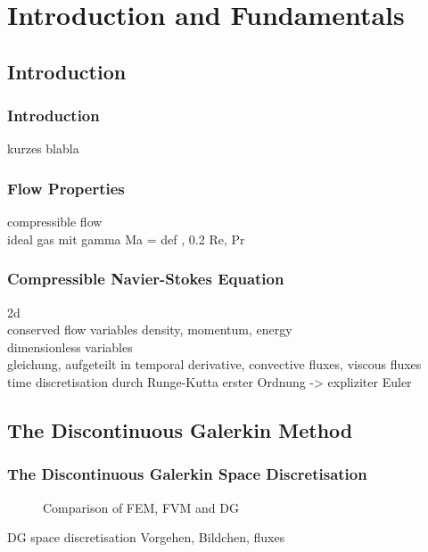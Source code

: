 \section{Introduction and Fundamentals}
\frame{\tableofcontents[currentsection]}
	\subsection{Introduction}
	\begin{frame}
		\frametitle{Introduction}
		kurzes blabla
	\end{frame}
	\begin{frame}
		\frametitle{Flow Properties}
		compressible flow \\
		ideal gas mit gamma
		Ma = def , 0.2
		Re, Pr	
	\end{frame}
	\begin{frame}
		\frametitle{Compressible Navier-Stokes Equation}
		2d\\
		conserved flow variables density, momentum, energy\\
		dimensionless variables\\
		gleichung, aufgeteilt in temporal derivative, convective fluxes, viscous fluxes\\
		time discretisation durch Runge-Kutta erster Ordnung -> expliziter Euler
	\end{frame}
	\subsection{The Discontinuous Galerkin Method}
	\begin{frame}
		\frametitle{The Discontinuous Galerkin Space Discretisation}
		\begin{figure}
			\centering
			\caption{Comparison of FEM, FVM and DG}
			\label{fig:1}
		\end{figure}

		DG space discretisation Vorgehen, Bildchen, fluxes
	\end{frame}
